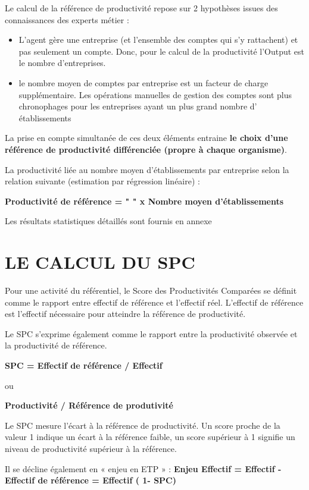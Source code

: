 \documentclass[
]{book}
\begin{document}
Le calcul de la référence de productivité repose sur 2 hypothèses issues des connaissances des experts métier :

\begin{itemize}
\item
  L'agent gère une entreprise (et l'ensemble des comptes qui s'y rattachent) et pas seulement un compte. Donc, pour le calcul de la productivité l'Output est le nombre d'entreprises.
\item
  le nombre moyen de comptes par entreprise est un facteur de charge supplémentaire. Les opérations manuelles de gestion des comptes sont plus chronophages pour les entreprises ayant un plus grand nombre d' établissements
\end{itemize}

La prise en compte simultanée de ces deux éléments entraine \textbf{le choix d'une référence de productivité différenciée (propre à chaque organisme)}.

La productivité liée au nombre moyen d'établissements par entreprise selon la relation suivante (estimation par régression linéaire) :

\textbf{Productivité de référence = " " x Nombre moyen d'établissements}

Les résultats statistiques détaillés sont fournis en annexe

\hypertarget{le-calcul-du-spc-2}{%
\section{LE CALCUL DU SPC}\label{le-calcul-du-spc-2}}

Pour une activité du référentiel, le Score des Productivités Comparées se définit comme le rapport entre effectif de référence et l'effectif réel. L'effectif de référence est l'effectif nécessaire pour atteindre la référence de productivité.

Le SPC s'exprime également comme le rapport entre la productivité observée et la productivité de référence.

\textbf{SPC = Effectif de référence / Effectif}

ou

\textbf{Productivité / Référence de produtivité}

Le SPC mesure l'écart à la référence de productivité. Un score proche de la valeur 1 indique un écart à la référence faible, un score supérieur à 1 signifie un niveau de productivité supérieur à la référence.

Il se décline également en « enjeu en ETP » :
\textbf{Enjeu Effectif = Effectif - Effectif de référence = Effectif ( 1- SPC)}
\end{document}
